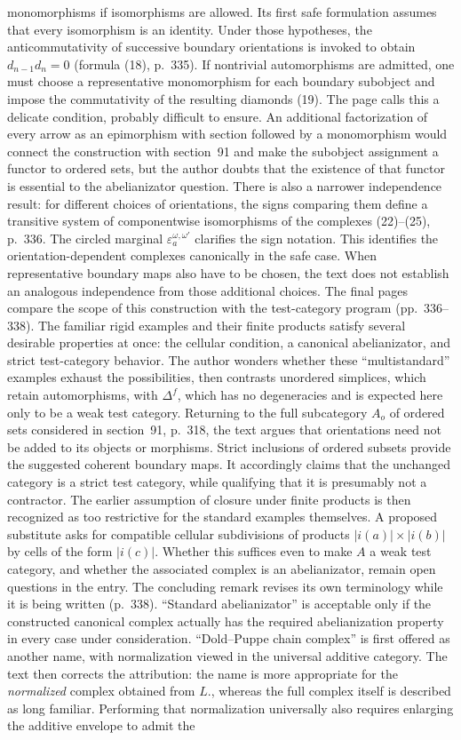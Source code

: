 \documentclass[10pt,oneside]{book}
\begin{document}
monomorphisms if isomorphisms are allowed. Its first safe formulation assumes that every isomorphism is an identity. Under those hypotheses, the anticommutativity of successive boundary orientations is invoked to obtain $d_{n-1}d_n=0$ (formula (18), p.~335). If nontrivial automorphisms are admitted, one must choose a representative monomorphism for each boundary subobject and impose the commutativity of the resulting diamonds (19). The page calls this a delicate condition, probably difficult to ensure. An additional factorization of every arrow as an epimorphism with section followed by a monomorphism would connect the construction with section~91 and make the subobject assignment a functor to ordered sets, but the author doubts that the existence of that functor is essential to the abelianizator question. There is also a narrower independence result: for different choices of orientations, the signs comparing them define a transitive system of componentwise isomorphisms of the complexes (22)--(25), p.~336. The circled marginal $\varepsilon_a^{\omega,\omega'}$ clarifies the sign notation. This identifies the orientation-dependent complexes canonically in the safe case. When representative boundary maps also have to be chosen, the text does not establish an analogous independence from those additional choices. The final pages compare the scope of this construction with the test-category program (pp.~336--338). The familiar rigid examples and their finite products satisfy several desirable properties at once: the cellular condition, a canonical abelianizator, and strict test-category behavior. The author wonders whether these ``multistandard'' examples exhaust the possibilities, then contrasts unordered simplices, which retain automorphisms, with $\Delta^f$, which has no degeneracies and is expected here only to be a weak test category. Returning to the full subcategory $A_o$ of ordered sets considered in section~91, p.~318, the text argues that orientations need not be added to its objects or morphisms. Strict inclusions of ordered subsets provide the suggested coherent boundary maps. It accordingly claims that the unchanged category is a strict test category, while qualifying that it is presumably not a contractor. The earlier assumption of closure under finite products is then recognized as too restrictive for the standard examples themselves. A proposed substitute asks for compatible cellular subdivisions of products $|i(a)|\times|i(b)|$ by cells of the form $|i(c)|$. Whether this suffices even to make $A$ a weak test category, and whether the associated complex is an abelianizator, remain open questions in the entry. The concluding remark revises its own terminology while it is being written (p.~338). ``Standard abelianizator'' is acceptable only if the constructed canonical complex actually has the required abelianization property in every case under consideration. ``Dold--Puppe chain complex'' is first offered as another name, with normalization viewed in the universal additive category. The text then corrects the attribution: the name is more appropriate for the \emph{normalized} complex obtained from $L.$, whereas the full complex itself is described as long familiar. Performing that normalization universally also requires enlarging the additive envelope to admit the 
\end{document}
